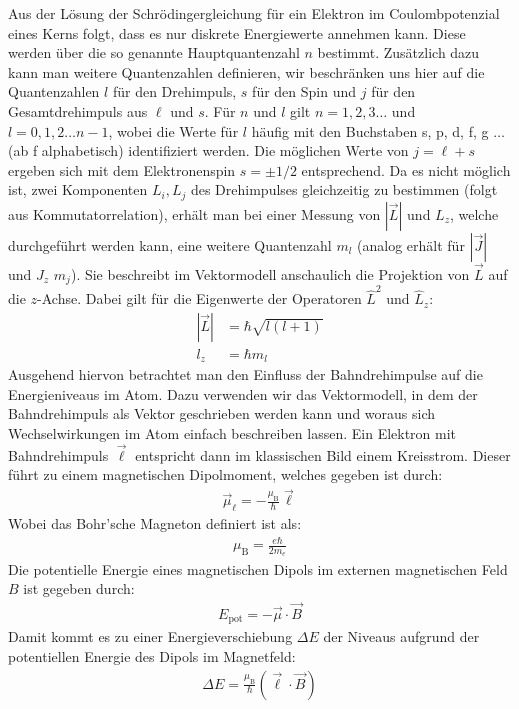 \documentclass[11pt, a4paper]{article}
\begin{document}
Aus der Lösung der Schrödingergleichung für ein Elektron im Coulombpotenzial eines Kerns folgt, dass es nur diskrete Energiewerte annehmen kann.
Diese werden über die so genannte Hauptquantenzahl $n$ bestimmt.
Zusätzlich dazu kann man weitere Quantenzahlen definieren, wir beschränken uns hier auf die Quantenzahlen $l$ für den Drehimpuls, $s$ für den Spin und $j$ für den Gesamtdrehimpuls aus $\ell$ und $s$.
Für $n$ und $l$ gilt $n=1, 2, 3 \dots$ und $l=0, 1, 2 \dots n-1$, wobei die Werte für $l$ häufig mit den Buchstaben s, p, d, f, g $\dots$ (ab f alphabetisch) identifiziert werden.
Die möglichen Werte von $j=\ell+s$ ergeben sich mit dem Elektronenspin $s=\pm1/2$ entsprechend.
Da es nicht möglich ist, zwei Komponenten $L_i, L_j$ des Drehimpulses gleichzeitig zu bestimmen (folgt aus Kommutatorrelation), erhält man bei einer Messung von $|\vec{L}|$ und $L_z$, welche durchgeführt werden kann, eine weitere Quantenzahl $m_l$ (analog erhält für $|\vec{J}|$ und $J_z$ $m_j$). Sie beschreibt im Vektormodell anschaulich die Projektion von $\vec{L}$ auf die $z$-Achse.
Dabei gilt für die Eigenwerte der Operatoren $\hat{L}^2$ und $\hat{L}_z$:
\begin{align*}
|\vec{L}|&=\hbar\sqrt{l(l+1)}\\
l_z&=\hbar m_l
\end{align*}
Ausgehend hiervon betrachtet man den Einfluss der Bahndrehimpulse auf die Energieniveaus im Atom.
Dazu verwenden wir das Vektormodell, in dem der Bahndrehimpuls als Vektor geschrieben werden kann und woraus sich Wechselwirkungen im Atom einfach beschreiben lassen.
Ein Elektron mit Bahndrehimpuls $\vec{\ell}$ entspricht dann im klassischen Bild einem Kreisstrom.
Dieser führt zu einem magnetischen Dipolmoment, welches gegeben ist durch:
\begin{align*}
	\vec{\mu}_\ell = - \frac{\mu_\mathrm{B}}{\hbar} \vec{\ell}
\end{align*}
Wobei das Bohr'sche Magneton definiert ist als:
\begin{align*}
	\mu_\mathrm{B} = \frac{e \hbar}{2 m_e}
\end{align*}
Die potentielle Energie eines magnetischen Dipols im externen magnetischen Feld $B$ ist gegeben durch:
\begin{align*}
	E_\mathrm{pot} = - \vec{\mu} \cdot \vec{B}
\end{align*}
Damit kommt es zu einer Energieverschiebung $\Delta E$ der Niveaus aufgrund der potentiellen Energie des Dipols im Magnetfeld:
\begin{align*}
	\Delta E = \frac{\mu_\mathrm{B}}{\hbar} \left( \vec{\ell} \cdot \vec{B} \right)
\end{align*}
\end{document}
